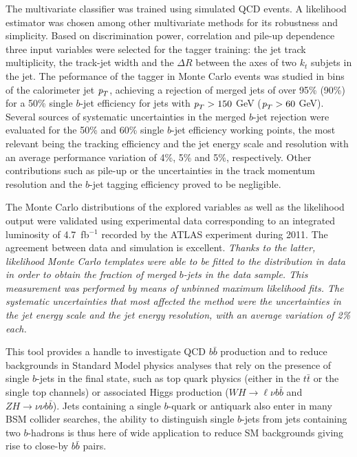 The multivariate classifier was trained using simulated QCD events. A likelihood estimator was chosen among other multivariate methods for its robustness and simplicity.  Based on discrimination power, correlation and pile-up dependence three input variables were selected for the tagger training: the jet track multiplicity, the track-jet width and the $\Delta R$ between the axes of two $k_t$ subjets in the jet. 
 The peformance of the tagger in Monte Carlo events was studied in bins of the calorimeter jet ${\emph{p}_{T}}$, achieving a rejection of merged jets of over 95\% (90\%) for a 50\% single $b$-jet efficiency for jets with ${\emph{p}_{T}}>150$ GeV (${\emph{p}_{T}}>60$ GeV).
Several sources of systematic uncertainties in the merged $b$-jet rejection were evaluated for the 50\% and 60\% single $b$-jet efficiency working points, the most relevant being the tracking efficiency and the jet energy scale and resolution with an average performance variation of 4\%, 5\% and 5\%, respectively. Other contributions such as pile-up or the uncertainties in the track momentum resolution and the $b$-jet tagging efficiency proved to be negligible.


The Monte Carlo distributions of the explored variables as well as the likelihood output were validated using experimental data corresponding to an integrated luminosity of 4.7~fb$^{-1}$ recorded by the ATLAS experiment during 2011. The agreement between data and simulation is excellent.
\emph{Thanks to the latter, likelihood Monte Carlo templates were able to be fitted to the distribution in data in order to obtain the fraction of merged $b$-jets in the data sample. This measurement was performed by means of unbinned maximum likelihood fits. The systematic uncertainties that most affected the method were the uncertainties in the jet energy scale and the jet energy resolution, with an average variation of 2\% each.}


This tool provides a handle to investigate QCD $b\bar{b}$ production and to reduce backgrounds in %
 Standard Model physics analyses that rely on the presence of single $b$-jets in the final state, such as top quark physics (either in the $t\bar{t}$ or the single top channels) or associated Higgs production ($WH\rightarrow\ell\nu b\bar{b}$ and $ZH\rightarrow\nu\nu b\bar{b}$). %
 Jets containing a single $b$-quark or antiquark %
also enter in many BSM collider searches, the ability to distinguish single $b$-jets from jets containing two $b$-hadrons is thus here of wide application to reduce SM backgrounds giving rise to close-by $b\bar{b}$ pairs.

